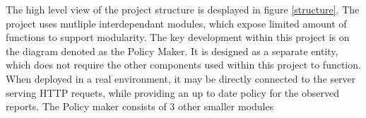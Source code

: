The high level view of the project structure is desplayed in figure \ref{structure}.
The project uses mutliple interdependant modules, which expose limited amount of functions to support modularity.
The key development within this project is on the diagram denoted as the Policy Maker.
It is designed as a separate entity, which does not require the other components used within this project to function.
When deployed in a real environment, it may be directly connected to the server serving HTTP requets, while providing an up to date policy for the observed reports.
The Policy maker consists of 3 other smaller modules 
